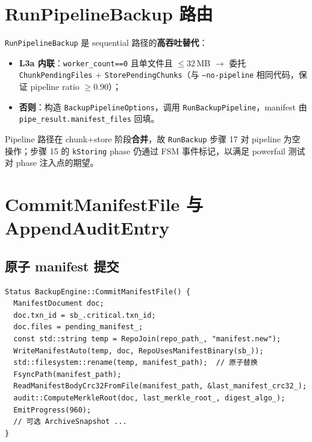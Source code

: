 \section{RunPipelineBackup 路由}
\label{sec:be-pipeline-route}

\texttt{RunPipelineBackup} 是 sequential 路径的\textbf{高吞吐替代}：

\begin{designbox}[路由规则]
\begin{itemize}[nosep]
  \item \textbf{L3a 内联}：\texttt{worker\_count==0} 且单文件且 $\leq$32\,MB $\rightarrow$ 委托 \texttt{ChunkPendingFiles} + \texttt{StorePendingChunks}（与 \texttt{--no-pipeline} 相同代码，保证 pipeline ratio $\geq$0.90）；
  \item \textbf{否则}：构造 \texttt{BackupPipelineOptions}，调用 \texttt{RunBackupPipeline}，manifest 由 \texttt{pipe\_result.manifest\_files} 回填。
\end{itemize}
\end{designbox}

Pipeline 路径在 chunk+store 阶段\textbf{合并}，故 \texttt{RunBackup} 步骤 17 对 pipeline 为空操作；步骤 15 的 \texttt{kStoring} phase 仍通过 FSM 事件标记，以满足 powerfail 测试对 phase 注入点的期望。

\section{CommitManifestFile 与 AppendAuditEntry}
\label{sec:be-commit-audit}

\subsection{原子 manifest 提交}

\begin{lstlisting}[caption={CommitManifestFile 原子写路径},label={lst:commit-manifest}]
Status BackupEngine::CommitManifestFile() {
  ManifestDocument doc;
  doc.txn_id = sb_.critical.txn_id;
  doc.files = pending_manifest_;
  const std::string temp = RepoJoin(repo_path_, "manifest.new");
  WriteManifestAuto(temp, doc, RepoUsesManifestBinary(sb_));
  std::filesystem::rename(temp, manifest_path);  // 原子替换
  FsyncPath(manifest_path);
  ReadManifestBodyCrc32FromFile(manifest_path, &last_manifest_crc32_);
  audit::ComputeMerkleRoot(doc, last_merkle_root_, digest_algo_);
  EmitProgress(960);
  // 可选 ArchiveSnapshot ...
}
\end{lstlisting}

